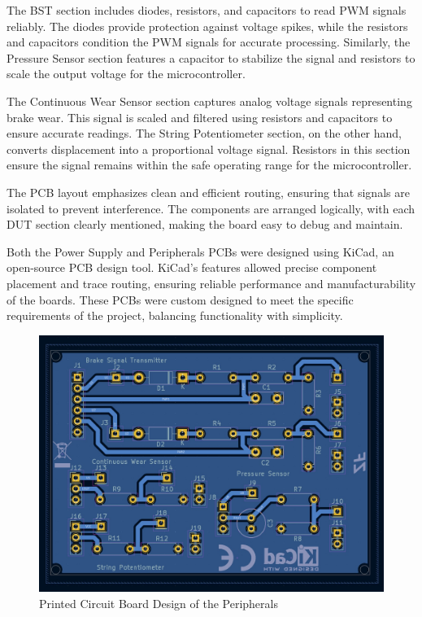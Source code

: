 \documentclass[12pt]{article}
\begin{document}
The BST section includes diodes, resistors, and capacitors to read PWM signals
reliably. The diodes provide protection against voltage spikes, while the
resistors and capacitors condition the PWM signals for accurate processing.
Similarly, the Pressure Sensor section features a capacitor to stabilize the
signal and resistors to scale the output voltage for the microcontroller.

The Continuous Wear Sensor section captures analog voltage signals representing
brake wear. This signal is scaled and filtered using resistors and capacitors
to ensure accurate readings. The String Potentiometer section, on the other
hand, converts displacement into a proportional voltage signal. Resistors in
this section ensure the signal remains within the safe operating range for the
microcontroller.

The PCB layout emphasizes clean and efficient routing, ensuring that signals
are isolated to prevent interference. The components are arranged logically,
with each DUT section clearly mentioned, making the board easy to debug and
maintain.

Both the Power Supply and Peripherals PCBs were designed using KiCad, an
open-source PCB design tool. KiCad's features allowed precise component
placement and trace routing, ensuring reliable performance and
manufacturability of the boards. These PCBs were custom designed to meet the
specific requirements of the project, balancing functionality with simplicity.

\begin{figure}[H]
  \includegraphics[width=\textwidth]{../assets/pcb/image8.jpg}
  \caption{Printed Circuit Board Design of the Peripherals}
\end{figure}
\end{document}
